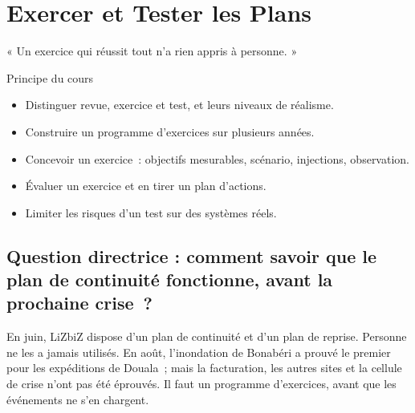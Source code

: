 
\chapter{Exercer et Tester les Plans}
\label{chap:exercer}

\epigraph{%
    « Un exercice qui réussit tout n'a rien appris à personne. »%
}{Principe du cours}


\begin{boxobjectifs}
\begin{itemize}
    \item Distinguer revue, exercice et test, et leurs niveaux de réalisme.
    \item Construire un programme d'exercices sur plusieurs années.
    \item Concevoir un exercice~: objectifs mesurables, scénario, injections,
          observation.
    \item Évaluer un exercice et en tirer un plan d'actions.
    \item Limiter les risques d'un test sur des systèmes réels.
\end{itemize}
\end{boxobjectifs}

\bigskip

\section*{Question directrice : comment savoir que le plan de continuité fonctionne, avant la prochaine crise~?}

En juin, LiZbiZ dispose d'un plan de continuité et d'un plan de reprise.
Personne ne les a jamais utilisés. En août, l'inondation de Bonabéri a
prouvé le premier pour les expéditions de Douala~; mais la facturation,
les autres sites et la cellule de crise n'ont pas été éprouvés. Il faut un
programme d'exercices, avant que les événements ne s'en chargent.

